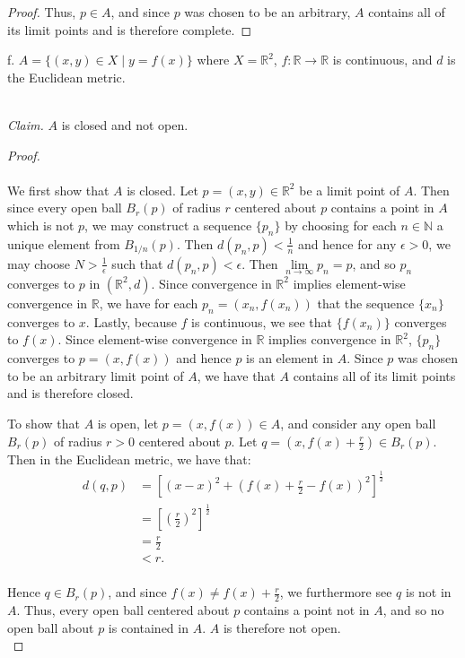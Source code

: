 \begin{proof}
    Thus, $p \in A$, and since $p$ was chosen to be an arbitrary, $A$ contains all of its limit points and is therefore
    complete.
\end{proof}

\pagebreak

f.  $A = \{ (x, y) \in X \mid y = f(x) \}$ where $X = \mathbb{R}^2$, $f:\mathbb{R} \to \mathbb{R}$ is continuous, and 
    $d$ is the Euclidean metric.

\ \\
\emph{Claim.} $A$ is closed and not open.

\begin{proof}\ \\\\
    We first show that $A$ is closed. Let $p = (x, y) \in \mathbb{R}^2$ be a limit point of $A$. Then since every open
    ball $B_r(p)$ of radius $r$ centered about $p$ contains a point in $A$ which is not $p$, we may construct a sequence 
    $\{ p_n \}$ by choosing for each $n \in \mathbb{N}$ a unique element from $B_{1/n}(p)$. Then 
    $d(p_n, p) < \frac{1}{n}$ and hence for any $\epsilon > 0$, we may choose $N > \frac{1}{\epsilon}$ such 
    that $d(p_n, p) < \epsilon$. Then $\lim\limits_{n \to \infty}{p_n} = p$, and so $p_n$ converges to $p$ in
    $(\mathbb{R}^2, d)$. Since convergence in $\mathbb{R}^2$ implies element-wise convergence in $\mathbb{R}$, we have 
    for each $p_n = (x_n, f(x_n))$ that the sequence $\{x_n\}$ converges to $x$. Lastly, because $f$ is continuous, we
    see that $\{ f(x_n) \}$ converges to $f(x)$. Since element-wise convergence in $\mathbb{R}$ implies convergence in
    $\mathbb{R}^2$, $\{p_n\}$ converges to $p = (x, f(x))$ and hence $p$ is an element in $A$. Since $p$ was chosen to 
    be an arbitrary limit point of $A$, we have that $A$ contains all of its limit points and is therefore closed.

    To show that $A$ is open, let $p = (x, f(x)) \in A$, and consider any open ball $B_r(p)$ of radius $r > 0$ centered 
    about $p$. Let $q = (x, f(x) + \frac{r}{2}) \in B_r(p)$. Then in the Euclidean metric, we have that:
    \begin{align*}
        d(q, p) &= \left[(x - x)^2 + \left( f(x) + \frac{r}{2} - f(x) \right)^2\right]^\frac{1}{2} \\
                &= \left[ \left(\frac{r}{2}\right)^2 \right]^\frac{1}{2} \\
                &= \frac{r}{2} \\
                &< r. \\
    \end{align*}
    
    Hence $q \in B_r(p)$, and since $f(x) \neq f(x) + \frac{r}{2}$, we furthermore see $q$ is not in $A$. Thus, every 
    open ball centered about $p$ contains a point not in $A$, and so no open ball about $p$ is contained in $A$. $A$ is
    therefore not open.
    \ \\
\end{proof}

\pagebreak